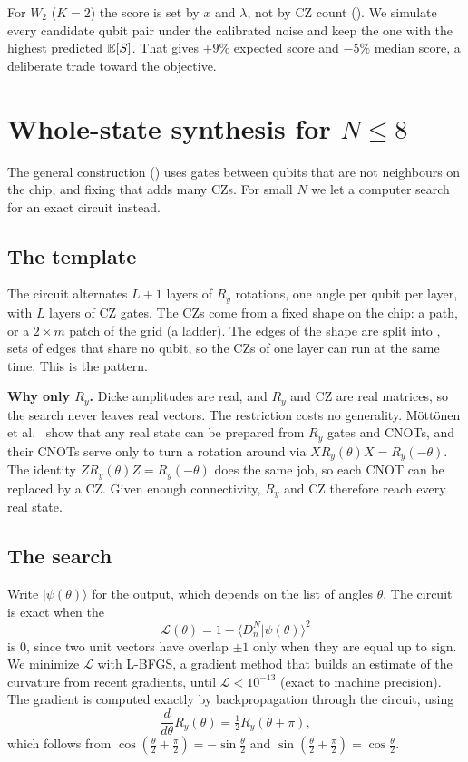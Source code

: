 \documentclass[11pt]{scrartcl}
\newcommand{\ket}[1]{\lvert #1\rangle}
\newcommand{\D}[2]{D^{#1}_{#2}}
\newcommand{\CZ}{\ensuremath{\mathrm{CZ}}}
\begin{document}
For $W_2$ ($K=2$) the score is set by $x$ and $\lambda$, not by \CZ{} count (). We
simulate every candidate qubit pair under the calibrated noise and keep the one with the highest
predicted $\mathbb E[S]$. That gives $+9\%$ expected score and $-5\%$ median score, a deliberate trade
toward the objective.

\section{Whole-state synthesis for \texorpdfstring{$N\le8$}{N <= 8}}\label{sec:synth}

The general construction () uses gates between qubits that are not neighbours on the
chip, and fixing that adds many \CZ{}s. For small $N$ we let a computer search for an exact circuit
instead.

\subsection{The template}

The circuit alternates $L+1$ layers of $R_y$ rotations, one angle per qubit per layer, with $L$
layers of \CZ{} gates. The \CZ{}s come from a fixed shape on the chip: a path, or a $2\times m$
patch of the grid (a ladder). The edges of the shape are split into , sets of edges
that share no qubit, so the \CZ{}s of one layer can run at the same time. This is the
 pattern.

\textbf{Why only $R_y$.} Dicke amplitudes are real, and $R_y$ and \CZ{} are real matrices, so the
search never leaves real vectors. The restriction costs no generality. Möttönen et al.~\cite{mottonen05}
show that any real state can be prepared from $R_y$ gates and CNOTs, and their CNOTs serve only to
turn a rotation around via $XR_y(\theta)X=R_y(-\theta)$. The identity $ZR_y(\theta)Z=R_y(-\theta)$
does the same job, so each CNOT can be replaced by a \CZ{}. Given enough connectivity, $R_y$ and \CZ{}
therefore reach every real state.

\subsection{The search}

Write $\ket{\psi(\theta)}$ for the output, which depends on the list of angles $\theta$. The circuit
is exact when the 
\[
  \mathcal L(\theta)=1-\langle \D Nn\vert\psi(\theta)\rangle^2
\]
is 0, since two unit vectors have overlap $\pm1$ only when they are equal up to sign. We minimize
$\mathcal L$ with L-BFGS, a gradient method that builds an estimate of the curvature from recent
gradients, until $\mathcal L<10^{-13}$ (exact to machine precision). The gradient is computed exactly
by backpropagation through the circuit, using
\[
  \frac{d}{d\theta}R_y(\theta)=\tfrac12R_y(\theta+\pi),
\]
which follows from $\cos(\tfrac\theta2+\tfrac\pi2)=-\sin\tfrac\theta2$ and
$\sin(\tfrac\theta2+\tfrac\pi2)=\cos\tfrac\theta2$.
\end{document}
